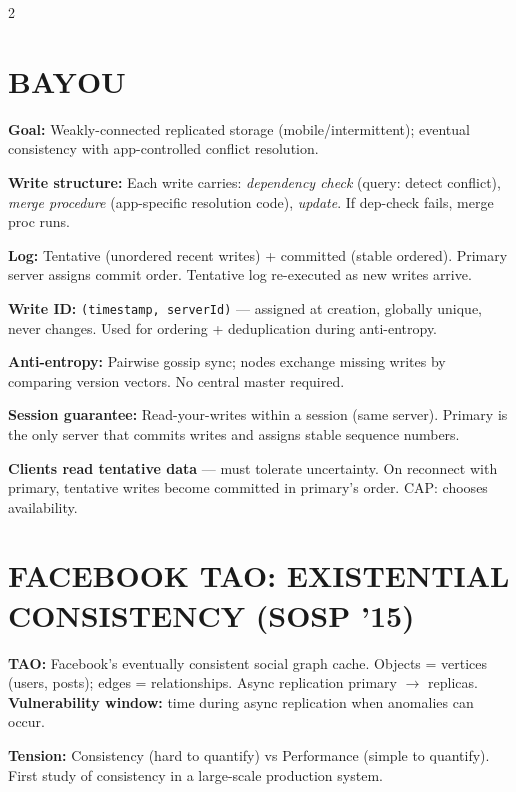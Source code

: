 \documentclass[9pt]{article}
\begin{document}
\begin{multicols*}{2}
\section*{BAYOU}

\textbf{Goal:} Weakly-connected replicated storage (mobile/intermittent); eventual consistency with app-controlled conflict resolution.

\textbf{Write structure:} Each write carries: \emph{dependency check} (query: detect conflict), \emph{merge procedure} (app-specific resolution code), \emph{update}. If dep-check fails, merge proc runs.

\textbf{Log:} Tentative (unordered recent writes) + committed (stable ordered). Primary server assigns commit order. Tentative log re-executed as new writes arrive.

\textbf{Write ID:} \texttt{(timestamp, serverId)} — assigned at creation, globally unique, never changes. Used for ordering + deduplication during anti-entropy.

\textbf{Anti-entropy:} Pairwise gossip sync; nodes exchange missing writes by comparing version vectors. No central master required.

\textbf{Session guarantee:} Read-your-writes within a session (same server). Primary is the only server that commits writes and assigns stable sequence numbers.

\textbf{Clients read tentative data} — must tolerate uncertainty. On reconnect with primary, tentative writes become committed in primary's order. CAP: chooses availability.

\section*{FACEBOOK TAO: EXISTENTIAL CONSISTENCY (SOSP '15)}

\textbf{TAO:} Facebook's eventually consistent social graph cache. Objects = vertices (users, posts); edges = relationships. Async replication primary $\to$ replicas. \textbf{Vulnerability window:} time during async replication when anomalies can occur.

\textbf{Tension:} Consistency (hard to quantify) vs Performance (simple to quantify). First study of consistency in a large-scale production system.


\end{multicols*}
\end{document}
